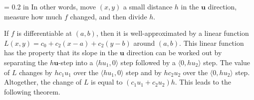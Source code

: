 \documentclass{watsonbook}
\begin{document}
  \begin{minipage}[t]{0.6\textwidth} \parskip = 0.2 in
    In other words, move $(x,y)$ a small distance $h$ in the
    $\mathbf{u}$ direction, measure how much $f$ changed, and then
    divide $h$.

    If $f$ is differentiable at $(a,b)$, then it is well-approximated
    by a linear function $L(x,y) = c_0 + c_2(x-a) + c_2(y-b)$ around
    $(a,b)$. This linear function has the property that its slope in
    the $\mathbf{u}$ direction can be worked out by separating the
    $h\mathbf{u}$-step into a $\langle hu_1, 0 \rangle$ step followed
    by a $\langle 0, hu_2 \rangle$ step. The value of $L$ changes by
    $hc_1u_1$ over the $\langle hu_1, 0 \rangle$ step and by
    $hc_2u_2$ over the $\langle 0, hu_2 \rangle$ step. Altogether, the
    change of $L$ is equal to $(c_1u_1 + c_2u_2 )h$. This
    leads to the following theorem.
  \end{minipage}
\end{document}
